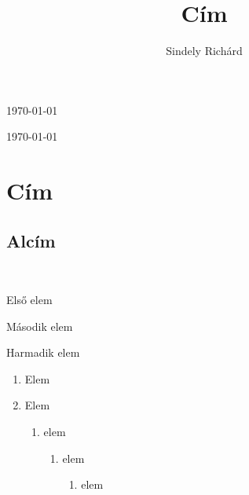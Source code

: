 \documentclass[12pt]{article}
\title{Cím}
\author{Sindely Richárd}
\begin{document}
\maketitle
{}
\frenchspacing
\noindent\setlength{\parskip}{12pt}\hulipsum[1]
\today
\begin{flushright}
{\foreignlanguage{latin}{\lipsum[1]}}
\end{flushright}
{
\linespread{1.6}\selectfont\blindtext[1]
\today
}
\newpage
\section{Cím}
\hulipsum[3]
\newpage
\subsection{Alcím}
\hulipsum[1]
\\
\begin{itemize*}[itemjoin*={\hspace{1em}és },label=\$]
\item Első elem
\item Második elem
\item Harmadik elem
\end{itemize*}
\begin{enumerate}
\item Elem
\item Elem
\begin{enumerate}[label*=.\arabic*]
\item elem
\begin{enumerate}
\item elem
\begin{enumerate}
\item elem
\end{enumerate}
\end{enumerate}
\end{enumerate}
\end{enumerate}
\newpage
\end{document}
